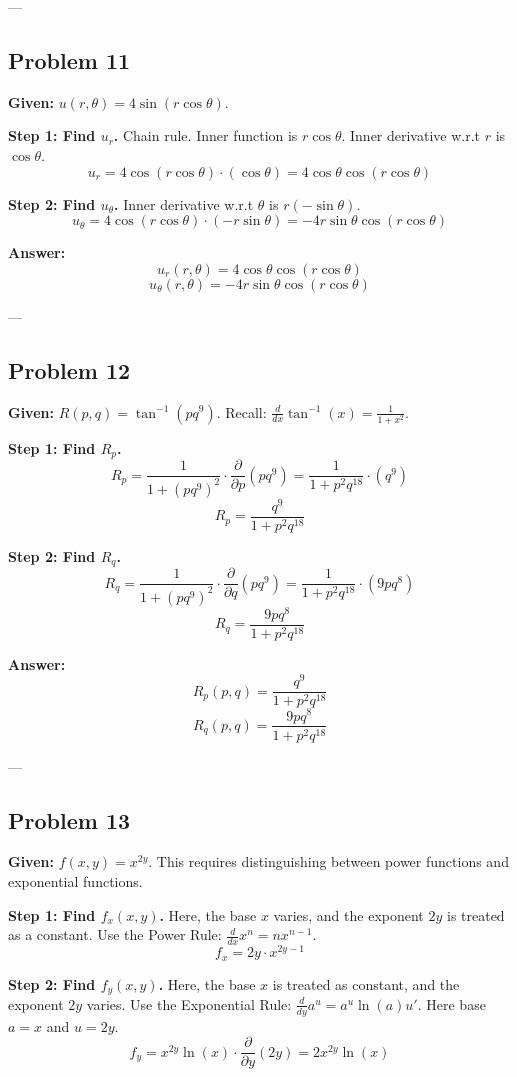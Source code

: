 \documentclass{article}
\begin{document}
---

\subsection*{Problem 11}
\textbf{Given:} $u(r, \theta) = 4\sin(r \cos \theta)$.

\textbf{Step 1: Find $u_r$.}
Chain rule. Inner function is $r \cos \theta$.
Inner derivative w.r.t $r$ is $\cos \theta$.
\[ u_r = 4\cos(r \cos \theta) \cdot (\cos \theta) = 4\cos \theta \cos(r \cos \theta) \]

\textbf{Step 2: Find $u_\theta$.}
Inner derivative w.r.t $\theta$ is $r(-\sin \theta)$.
\[ u_\theta = 4\cos(r \cos \theta) \cdot (-r \sin \theta) = -4r \sin \theta \cos(r \cos \theta) \]

\textbf{Answer:}
\[ u_r(r, \theta) = 4\cos \theta \cos(r \cos \theta) \]
\[ u_\theta(r, \theta) = -4r \sin \theta \cos(r \cos \theta) \]

---

\subsection*{Problem 12}
\textbf{Given:} $R(p, q) = \tan^{-1}(pq^9)$.
Recall: $\frac{d}{dx} \tan^{-1}(x) = \frac{1}{1+x^2}$.

\textbf{Step 1: Find $R_p$.}
\[ R_p = \frac{1}{1 + (pq^9)^2} \cdot \frac{\partial}{\partial p}(pq^9) = \frac{1}{1 + p^2q^{18}} \cdot (q^9) \]
\[ R_p = \frac{q^9}{1 + p^2q^{18}} \]

\textbf{Step 2: Find $R_q$.}
\[ R_q = \frac{1}{1 + (pq^9)^2} \cdot \frac{\partial}{\partial q}(pq^9) = \frac{1}{1 + p^2q^{18}} \cdot (9pq^8) \]
\[ R_q = \frac{9pq^8}{1 + p^2q^{18}} \]

\textbf{Answer:}
\[ R_p(p, q) = \frac{q^9}{1 + p^2q^{18}} \]
\[ R_q(p, q) = \frac{9pq^8}{1 + p^2q^{18}} \]

---

\subsection*{Problem 13}
\textbf{Given:} $f(x, y) = x^{2y}$.
This requires distinguishing between power functions and exponential functions.

\textbf{Step 1: Find $f_x(x, y)$.}
Here, the base $x$ varies, and the exponent $2y$ is treated as a constant.
Use the Power Rule: $\frac{d}{dx} x^n = n x^{n-1}$.
\[ f_x = 2y \cdot x^{2y - 1} \]

\textbf{Step 2: Find $f_y(x, y)$.}
Here, the base $x$ is treated as constant, and the exponent $2y$ varies.
Use the Exponential Rule: $\frac{d}{dy} a^u = a^u \ln(a) u'$.
Here base $a=x$ and $u=2y$.
\[ f_y = x^{2y} \ln(x) \cdot \frac{\partial}{\partial y}(2y) = 2 x^{2y} \ln(x) \]
\end{document}
